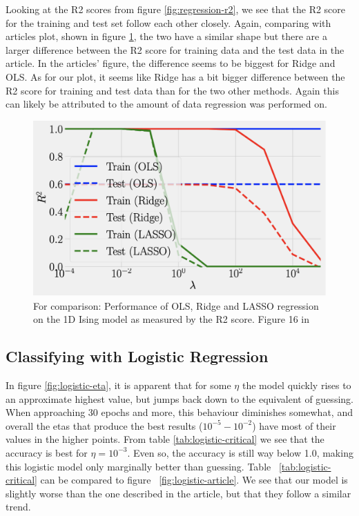 Looking at the R2 scores from figure \ref{fig:regression-r2}, we see 
that the R2 score for the training and test set follow each other closely. 
Again, comparing with articles plot, shown in figure 
\ref{fig:regression-r2-article}, the two have a similar shape 
but there are a larger difference between the R2 score for training 
data and the test data in the article. 
In the articles' figure, the difference seems to be biggest for Ridge and 
OLS. As for our plot, it seems like Ridge has a bit bigger difference 
between the R2 score for training and test data than for the two other 
methods. Again this can likely be attributed to the amount of data regression
was performed on.

\begin{figure}[H]
    \centering
\includegraphics[width = 0.6\paperwidth]{figures/R2_article.png}
\caption{For comparison: Performance of OLS, Ridge and LASSO regression on the 1D Ising model as measured by the 
    R2 score. Figure 16 in \cite{HighBias}} 
\label{fig:regression-r2-article}

\end{figure}
\subsection{Classifying with Logistic Regression}
In figure \ref{fig:logistic-eta}, it is apparent that for some $\eta$ the model 
quickly rises to an approximate highest value, but jumps back down to 
the equivalent of guessing.
When approaching 30 epochs and more, this behaviour 
diminishes somewhat, and overall the etas that produce the best results 
($10^{-5} - 10^{-2}$) have most of their values in the higher points.
From table \ref{tab:logistic-critical} we see that the accuracy is best
for \(\eta = 10^{-3}\). Even so, the accuracy is still 
way below 1.0, making this logistic model only marginally better than guessing. 
Table ~\ref{tab:logistic-critical} can be compared to figure 
~\ref{fig:logistic-article}. We see that our model is slightly 
worse than the one described in the article, but that they 
follow a similar trend.

